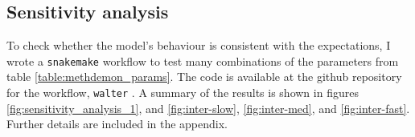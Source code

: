 \subsection{Sensitivity analysis}
To check whether the model's behaviour is consistent with the expectations, I
wrote a \texttt{snakemake} workflow to test many combinations of the parameters
from table \ref{table:methdemon_params}. The code is available at the github
repository for the workflow, \texttt{walter} \cite{walter}. A summary of the
results is shown in figures \ref{fig:sensitivity_analysis_1}, and
\ref{fig:inter-slow}, \ref{fig:inter-med}, and \ref{fig:inter-fast}. Further
details are included in the appendix.

